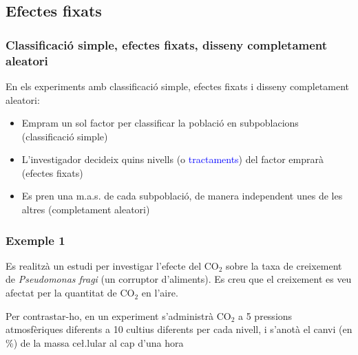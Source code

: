 \documentclass[12pt,t]{beamer}
\newcommand{\blue}[1]{\textcolor{blue}{#1}}
\renewcommand{\emph}[1]{{\color{red}#1}}
\theoremstyle{plain}
\theoremstyle{definition}
\begin{document}
\subsection{Efectes fixats}


\begin{frame}
\frametitle{Classificació simple, efectes fixats, disseny completament aleatori
}

En els experiments amb \emph{classificació simple, efectes fixats i disseny completament aleatori}:
\begin{itemize}
\item Empram un sol factor per classificar la població en subpoblacions (\emph{classificació simple})
\medskip

\item L'investigador decideix quins nivells (o \blue{tractaments}) del factor emprarà (\emph{efectes fixats})
\medskip

\item Es pren una m.a.s. de cada subpoblació,  de manera independent unes de les altres (\emph{completament aleatori})
\end{itemize}
\end{frame}


\begin{frame}
\frametitle{Exemple 1}
Es realitzà un estudi per investigar l'efecte del
CO${}_2$ sobre la taxa de creixement de {\it Pseudomonas fragi} (un corruptor d'aliments). 
Es creu que el creixement es veu afectat per la quantitat de CO${}_2$ en l'aire.
\medskip

Per contrastar-ho, en un experiment s'administrà CO${}_2$ a 5 pressions atmosfèriques
diferents a 10 cultius diferents per cada nivell, i s'anotà el canvi (en \%) de la massa ce\l.lular
al cap d'una hora

\end{frame}
\end{document}
